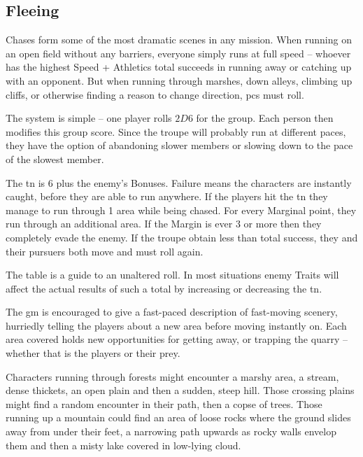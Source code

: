 \begin{multicols}{2}

\subsection{Fleeing}

Chases form some of the most dramatic scenes in any mission.
When running on an open field without any barriers, everyone simply runs at full speed -- whoever has the highest Speed + Athletics total succeeds in running away or catching up with an opponent.
But when running through marshes, down alleys, climbing up cliffs, or otherwise finding a reason to change direction, \glspl{pc} must roll.

The system is simple -- one player rolls $2D6$ for the group.
Each person then modifies this group score.
Since the troupe will probably run at different paces, they have the option of abandoning slower members or slowing down to the pace of the slowest member.

The \gls{tn} is 6 plus the enemy's  Bonuses.
Failure means the characters are instantly caught, before they are able to run anywhere.
If the players hit the \gls{tn} they manage to run through 1 area while being chased.
For every Marginal point, they run through an additional area.
If the Margin is ever 3 or more then they completely evade the enemy.
If the troupe obtain less than total success, they and their pursuers both move and must roll again.

The table is a guide to an unaltered roll. In most situations enemy Traits will affect the actual results of such a total by increasing or decreasing the \gls{tn}.

The \gls{gm} is encouraged to give a fast-paced description of fast-moving scenery, hurriedly telling the players about a new area before moving instantly on.
Each area covered holds new opportunities for getting away, or trapping the quarry -- whether that is the players or their prey.

Characters running through forests might encounter a marshy area, a stream, dense thickets, an open plain and then a sudden, steep hill.
Those crossing plains might find a random encounter in their path, then a copse of trees.
Those running up a mountain could find an area of loose rocks where the ground slides away from under their feet, a narrowing path upwards as rocky walls envelop them and then a misty lake covered in low-lying cloud.


\end{multicols}
